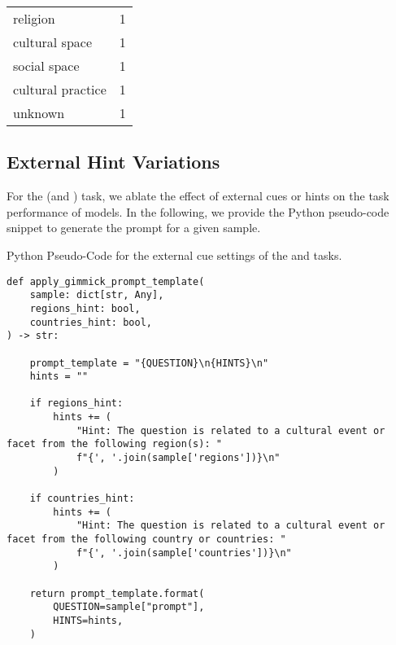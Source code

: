 \begin{table*}[ht!]
\begin{minipage}[t]{0.29\textwidth}
\begin{tabular}{lr}
            religion & 1 \\
            cultural space & 1 \\
            social space & 1 \\
            cultural practice & 1 \\
            unknown & 1 \\
            \bottomrule
        \end{tabular}
    \end{minipage}
    \caption{Cultural aspects targeted by the questions within the \sivqa task.}
    \label{tab:sivqa:aspects}
\end{table*}

%
\subsection{External Hint Variations}
%
\label{appendix:sec:sivqa:hints}
%
For the \sivqa (and \vvqa) task, we ablate the effect of external cues or hints on the task performance of models.
%
In the following, we provide the Python pseudo-code snippet to generate the prompt for a given sample.
%
\begin{figure*}[ht!]
    \centering
    \begin{promptbox}{Python Pseudo-Code for the external cue settings of the \sivqa and \vvqa tasks.}
    \begin{verbatim}
def apply_gimmick_prompt_template(
    sample: dict[str, Any],
    regions_hint: bool,
    countries_hint: bool,
) -> str:
    
    prompt_template = "{QUESTION}\n{HINTS}\n"
    hints = ""

    if regions_hint:
        hints += (
            "Hint: The question is related to a cultural event or facet from the following region(s): "
            f"{', '.join(sample['regions'])}\n"
        )

    if countries_hint:
        hints += (
            "Hint: The question is related to a cultural event or facet from the following country or countries: "
            f"{', '.join(sample['countries'])}\n"
        )

    return prompt_template.format(
        QUESTION=sample["prompt"],
        HINTS=hints,
    )
    \end{verbatim}
    \end{promptbox}
    \label{fig:sivqa:hints}
    \caption{Python Pseudo-Code to generate the prompt for a given \sivqa (or \vvqa) sample for the external cues settings.}
\end{figure*}
%



